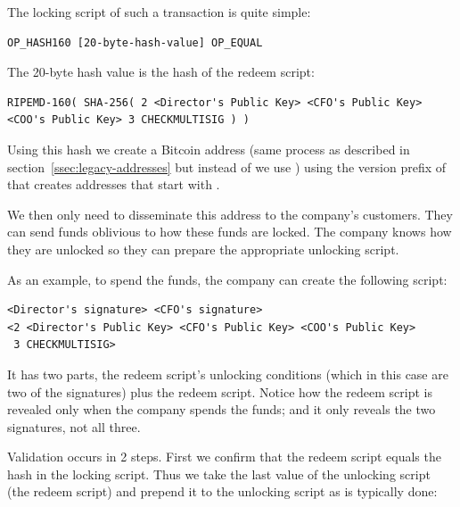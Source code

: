 The locking script of such a transaction is quite simple:

\begin{emphbox}
\begin{lstlisting}[style=Pseudomath]
OP_HASH160 [20-byte-hash-value] OP_EQUAL
\end{lstlisting}
\end{emphbox}

The 20-byte hash value is the hash of the redeem script:

\begin{emphbox}
\begin{lstlisting}[style=Pseudomath]
RIPEMD-160( SHA-256( 2 <Director's Public Key> <CFO's Public Key> 
<COO's Public Key> 3 CHECKMULTISIG ) )
\end{lstlisting}
\end{emphbox}

Using this hash we create a Bitcoin address (same process as described in section~\ref{ssec:legacy-addresses} but instead of  we use ) using the version prefix of  that creates addresses that start with . 

We then only need to disseminate this address to the company’s customers. They can send funds oblivious to how these funds are locked. The company knows how they are unlocked so they can prepare the appropriate unlocking script.

As an example, to spend the funds, the company can create the following script:

\begin{emphbox}
\begin{lstlisting}[style=Pseudomath]
<Director's signature> <CFO's signature> 
<2 <Director's Public Key> <CFO's Public Key> <COO's Public Key> 
 3 CHECKMULTISIG>
\end{lstlisting}
\end{emphbox}

It has two parts, the redeem script’s unlocking conditions (which in this case are two of the signatures) plus the redeem script. Notice how the redeem script is revealed only when the company spends the funds; and it only reveals the two signatures, not all three.

Validation occurs in 2 steps. First we confirm that the redeem script equals the hash in the locking script. Thus we take the last value of the unlocking script (the redeem script) and prepend it to the unlocking script as is typically done:


